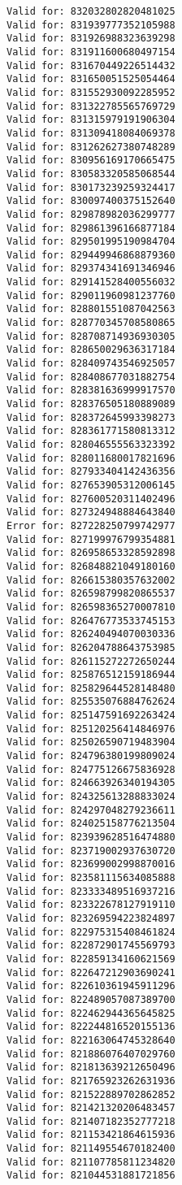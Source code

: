 \documentclass[11pt]{article}
\begin{document}
\begin{Verbatim}[commandchars=\\\{\}]
Valid for: 832032802820481025
Valid for: 831939777352105988
Valid for: 831926988323639298
Valid for: 831911600680497154
Valid for: 831670449226514432
Valid for: 831650051525054464
Valid for: 831552930092285952
Valid for: 831322785565769729
Valid for: 831315979191906304
Valid for: 831309418084069378
Valid for: 831262627380748289
Valid for: 830956169170665475
Valid for: 830583320585068544
Valid for: 830173239259324417
Valid for: 830097400375152640
Valid for: 829878982036299777
Valid for: 829861396166877184
Valid for: 829501995190984704
Valid for: 829449946868879360
Valid for: 829374341691346946
Valid for: 829141528400556032
Valid for: 829011960981237760
Valid for: 828801551087042563
Valid for: 828770345708580865
Valid for: 828708714936930305
Valid for: 828650029636317184
Valid for: 828409743546925057
Valid for: 828408677031882754
Valid for: 828381636999917570
Valid for: 828376505180889089
Valid for: 828372645993398273
Valid for: 828361771580813312
Valid for: 828046555563323392
Valid for: 828011680017821696
Valid for: 827933404142436356
Valid for: 827653905312006145
Valid for: 827600520311402496
Valid for: 827324948884643840
Error for: 827228250799742977
Valid for: 827199976799354881
Valid for: 826958653328592898
Valid for: 826848821049180160
Valid for: 826615380357632002
Valid for: 826598799820865537
Valid for: 826598365270007810
Valid for: 826476773533745153
Valid for: 826240494070030336
Valid for: 826204788643753985
Valid for: 826115272272650244
Valid for: 825876512159186944
Valid for: 825829644528148480
Valid for: 825535076884762624
Valid for: 825147591692263424
Valid for: 825120256414846976
Valid for: 825026590719483904
Valid for: 824796380199809024
Valid for: 824775126675836928
Valid for: 824663926340194305
Valid for: 824325613288833024
Valid for: 824297048279236611
Valid for: 824025158776213504
Valid for: 823939628516474880
Valid for: 823719002937630720
Valid for: 823699002998870016
Valid for: 823581115634085888
Valid for: 823333489516937216
Valid for: 823322678127919110
Valid for: 823269594223824897
Valid for: 822975315408461824
Valid for: 822872901745569793
Valid for: 822859134160621569
Valid for: 822647212903690241
Valid for: 822610361945911296
Valid for: 822489057087389700
Valid for: 822462944365645825
Valid for: 822244816520155136
Valid for: 822163064745328640
Valid for: 821886076407029760
Valid for: 821813639212650496
Valid for: 821765923262631936
Valid for: 821522889702862852
Valid for: 821421320206483457
Valid for: 821407182352777218
Valid for: 821153421864615936
Valid for: 821149554670182400
Valid for: 821107785811234820
Valid for: 821044531881721856

\end{Verbatim}
\end{document}
